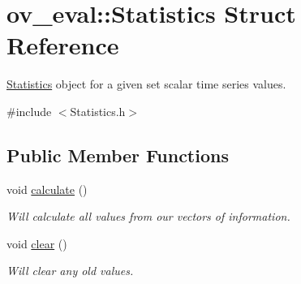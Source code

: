 \hypertarget{structov__eval_1_1Statistics}{}\section{ov\+\_\+eval\+:\+:Statistics Struct Reference}
\label{structov__eval_1_1Statistics}


\hyperlink{structov__eval_1_1Statistics}{Statistics} object for a given set scalar time series values.  




{\ttfamily \#include $<$Statistics.\+h$>$}

\subsection*{Public Member Functions}
\begin{DoxyCompactItemize}
\item 
\mbox{\label{structov__eval_1_1Statistics_ada896c0243989b2b8a366a0caa18a3c6}} 
void \hyperlink{structov__eval_1_1Statistics_ada896c0243989b2b8a366a0caa18a3c6}{calculate} ()
\begin{DoxyCompactList}\small\item\em Will calculate all values from our vectors of information. \end{DoxyCompactList}\item 
\mbox{\label{structov__eval_1_1Statistics_ad13e2a500d7c64297077485e39b36a6c}} 
void \hyperlink{structov__eval_1_1Statistics_ad13e2a500d7c64297077485e39b36a6c}{clear} ()
\begin{DoxyCompactList}\small\item\em Will clear any old values. \end{DoxyCompactList}\end{DoxyCompactItemize}
